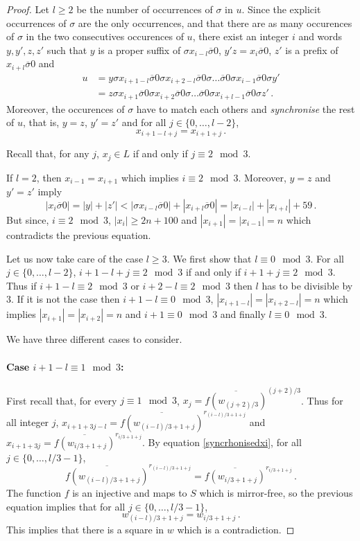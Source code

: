 \documentclass[a4paper,12pt]{article}
\newcommand{\hpal}{\sigma}
\begin{document}
\begin{proof}
Let $l\ge2$ be the number of occurrences of $\hpal $ in $u$. 
Since the explicit occurrences of $\hpal$ are the only occurrences, and that there are as many occurences of $\hpal$ in the two consecutives occurences of $u$,
there exist an integer $i$ and words $y,y',z, z'$ such that $y$ is a proper suffix of $\hpal x_{i-l}\overline{\hpal} 0$, $y'z=x_i\overline{\hpal}0$, $z'$ is a prefix of $x_{i+l}\overline{\hpal}  0 $ and  
\begin{align*}
u&=y\hpal x_{i+1-l}\overline{\hpal}  0 \hpal x_{i+2-l}\overline{\hpal}  0 \hpal \ldots \overline{\hpal}  0 \hpal x_{i-1}\overline{\hpal}  0 \hpal y'\\
&=z\hpal x_{i+1}\overline{\hpal}  0 \hpal x_{i+2}\overline{\hpal}  0 \hpal \ldots\overline{\hpal}  0 \hpal  x_{i+l-1}\overline{\hpal}  0 \hpal z'\,.                                                                                                             \end{align*}
Moreover, the occurences of $\hpal$ have to match each others and \emph{synchronise} the rest of $u$, that is, $y=z$, $y'=z'$ and for all $j\in\{0,\ldots,l-2\}$, 
\begin{equation}\label{syncrhonisedxi}
x_{i+1-l+j}=x_{i+1+j}\,.
\end{equation}

Recall that, for any $j$,  $x_j\in L$ if and only if $j\equiv 2 \mod 3$.

If $l=2$, then $x_{i-1}=x_{i+1}$ which implies $i\equiv 2\mod3$.
Moreover,  $y=z$ and $y'=z'$ imply 
$$|x_i\overline{\hpal} 0|=|y|+|z'|< |\hpal x_{i-l}\overline{\hpal} 0|+|x_{i+l}\overline{\hpal}  0|= |x_{i-l}|+|x_{i+l}|+59\,.$$ But since, $i\equiv 2\mod3$, $|x_i|\ge 2n+100$ and $|x_{i+1}|=|x_{i-1}|=n$ which contradicts the previous equation.

Let us now take care of the case $l\ge3$.
We first show that $l\equiv 0 \mod 3$.
For all  $j\in\{0,\ldots,l-2\}$,   $i+1-l+j\equiv 2 \mod 3$ if and only if $i+1+j\equiv 2 \mod 3$.
Thus if  $i+1-l\equiv 2 \mod 3$ or $i+2-l\equiv 2 \mod 3$ then $l$ has to be divisible by $3$. 
If it is not the case then  $i+1-l\equiv 0 \mod 3$, $|x_{i+1-l}|=|x_{i+2-l}|=n$ which implies $|x_{i+1}|=|x_{i+2}|=n$ and $i+1\equiv 0 \mod 3$ and finally $l \equiv 0\mod 3$. 

We have three different cases to consider.
\paragraph{Case $i+1-l \equiv 1\mod 3$:} First recall that, for every $j\equiv 1\mod 3$, $x_j= \overline {f(w_{(j+2)/3})}^{(j+2)/3}$. Thus for all integer $j$, 
$x_{i+1+3j-l}= \overline {f(w_{(i-l)/3+1+j})}^{r_{(i-l)/3+1+j}}$ and 
$x_{i+1+3j}=\overline { f(w_{i/3+1+j})}^{r_{i/3+1+j}}$.
By equation \eqref{syncrhonisedxi}, for all $j\in\{0,\ldots, l/3-1\}$,
 $$\overline {f(w_{(i-l)/3+1+j})}^{r_{(i-l)/3+1+j}}=\overline { f(w_{i/3+1+j})}^{r_{i/3+1+j}}\,.$$
The function $f$  is an injective and maps to $S$ which is mirror-free, so the previous equation implies that for all  $j\in\{0,\ldots, l/3-1\}$, $$w_{(i-l)/3+1+j}=w_{i/3+1+j}\,.$$
This implies that there is a square in $w$ which is a contradiction.


\end{proof}
\end{document}
